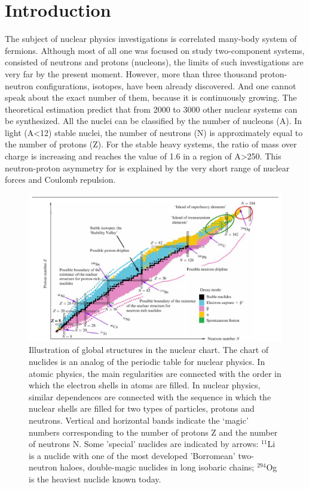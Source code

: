 \section{Introduction}

The subject of nuclear physics investigations is correlated many-body system of fermions. 
Although most of all one was focused on study two-component systems, consisted of neutrons and protons (nucleons), the limits of such investigations are very far by the present moment.
However, more than three thousand proton-neutron configurations, isotopes, have been already discovered.
And one cannot speak about the exact number of them, because it is continuously growing. 
The theoretical estimation predict that from 2000 to 3000 other nuclear systems can be synthesized.  
All the nuclei can be classified by the number of nucleons (A). 
In light (A<12) stable nuclei, the number of neutrons (N) is approximately equal to the number of protons (Z). 
For the stable heavy systems, the ratio of mass over charge is increasing and reaches the value of 1.6 in a region of A>250. 
This neutron-proton asymmetry for is explained by the very short range of nuclear forces and Coulomb repulsion.

\begin{figure}[t]
	\begin{center}
		\includegraphics[width=1\textwidth]{figures/map.png}
	\end{center}
	\caption{Illustration of global structures in the nuclear chart. 
		The chart of nuclides is an analog of the periodic table for nuclear physics. 
		In atomic physics, the main regularities are connected with the order in which the electron shells in atoms are filled. 
		In nuclear physics, similar dependences are connected with the sequence in which the nuclear shells are filled for two types of particles, protons and neutrons. 
		Vertical and horizontal bands indicate the `magic' numbers corresponding to the number of protons Z and the number of neutrons N. 
		Some 'special' nuclides are indicated by arrows: $^{11}$Li is a nuclide with one of the most developed 'Borromean' two-neutron haloes, double-magic nuclides in long isobaric chains; $^{294}$Og is the heaviest nuclide known today.}
	\label{fig:nuclear_chart}
\end{figure}


